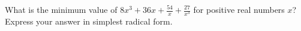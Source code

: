 What is the minimum value of $8x^3+36x+\frac{54}{x}+\frac{27}{x^3}$ for positive real numbers $x$? Express your answer in simplest radical form.